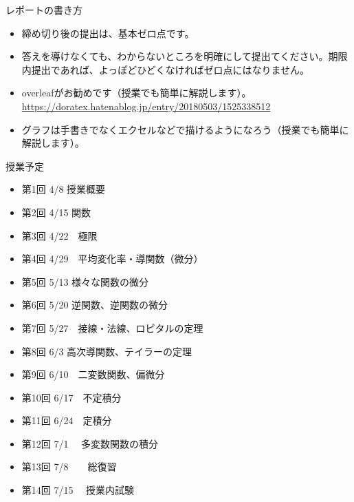 \begin{slide}{レポートの書き方}
\begin{itemize}
\item 締め切り後の提出は、基本ゼロ点です。
\item 答えを導けなくても、わからないところを明確にして提出てください。期限内提出であれば、よっぽどひどくなければゼロ点にはなりません。
\item overleafがお勧めです（授業でも簡単に解説します）。
\url{https://doratex.hatenablog.jp/entry/20180503/1525338512}
\item グラフは手書きでなくエクセルなどで描けるようになろう（授業でも簡単に解説します）。
\end{itemize}

\end{slide}
\begin{slide}{授業予定}
\begin{itemize}
\item 第1回 4/8 授業概要
\item 第2回 4/15	関数
\item 第3回 4/22　極限
\item 第4回 4/29　平均変化率・導関数（微分）
\item 第5回 5/13	様々な関数の微分
\item 第6回 5/20	逆関数、逆関数の微分
\item 第7回 5/27　接線・法線、ロピタルの定理
\item 第8回 6/3	高次導関数、テイラーの定理
\item 第9回 6/10　二変数関数、偏微分
\item 第10回 6/17　不定積分
\item 第11回 6/24　定積分
\item 第12回 7/1 　多変数関数の積分
\item 第13回 7/8　　総復習
\item 第14回 7/15 　授業内試験
\end{itemize}
\end{slide}

